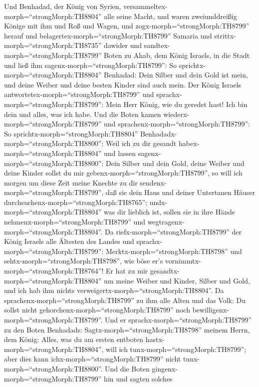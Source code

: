  Und Benhadad, der König von Syrien,
versammeltex-morph=``strongMorph:TH8804'' alle seine Macht, und waren
zweiunddreißig Könige mit ihm und Roß und Wagen, und
zogx-morph=``strongMorph:TH8799'' herauf und
belagertex-morph=``strongMorph:TH8799'' Samaria und
strittx-morph=``strongMorph:TH8735'' dawider  und
sandtex-morph=``strongMorph:TH8799'' Boten zu Ahab, dem König Israels,
in die Stadt  und ließ ihm
sagenx-morph=``strongMorph:TH8799'': So
sprichtx-morph=``strongMorph:TH8804'' Benhadad: Dein Silber und dein
Gold ist mein, und deine Weiber und deine besten Kinder sind auch mein.
 Der König Israels antwortetex-morph=``strongMorph:TH8799''
und sprachx-morph=``strongMorph:TH8799'': Mein Herr König, wie du
geredet hast! Ich bin dein und alles, was ich habe.  Und die
Boten kamen wiederx-morph=``strongMorph:TH8799'' und
sprachenx-morph=``strongMorph:TH8799'': So
sprichtx-morph=``strongMorph:TH8804''
Benhadadx-morph=``strongMorph:TH8800'': Weil ich zu dir gesandt
habex-morph=``strongMorph:TH8804'' und lassen
sagenx-morph=``strongMorph:TH8800'': Dein Silber und dein Gold, deine
Weiber und deine Kinder sollst du mir
gebenx-morph=``strongMorph:TH8799'',  so will ich morgen um
diese Zeit meine Knechte zu dir sendenx-morph=``strongMorph:TH8799'',
daß sie dein Haus und deiner Untertanen Häuser
durchsuchenx-morph=``strongMorph:TH8765'';
undx-morph=``strongMorph:TH8804'' was dir lieblich ist, sollen sie in
ihre Hände nehmenx-morph=``strongMorph:TH8799'' und
wegtragenx-morph=``strongMorph:TH8804''.  Da
riefx-morph=``strongMorph:TH8799'' der König Israels alle Ältesten des
Landes und sprachx-morph=``strongMorph:TH8799'':
Merktx-morph=``strongMorph:TH8798'' und
sehtx-morph=``strongMorph:TH8798'', wie böse er's
vornimmtx-morph=``strongMorph:TH8764''! Er hat zu mir
gesandtx-morph=``strongMorph:TH8804'' um meine Weiber und Kinder, Silber
und Gold, und ich hab ihm nichts
verweigertx-morph=``strongMorph:TH8804''.  Da
sprachenx-morph=``strongMorph:TH8799'' zu ihm alle Alten und das Volk:
Du sollst nicht gehorchenx-morph=``strongMorph:TH8799'' noch
bewilligenx-morph=``strongMorph:TH8799''.  Und er
sprachx-morph=``strongMorph:TH8799'' zu den Boten Benhadads:
Sagtx-morph=``strongMorph:TH8798'' meinem Herrn, dem König: Alles, was
du am ersten entboten hastx-morph=``strongMorph:TH8804'', will ich
tunx-morph=``strongMorph:TH8799''; aber dies kann
ichx-morph=``strongMorph:TH8799'' nicht
tunx-morph=``strongMorph:TH8800''. Und die Boten
gingenx-morph=``strongMorph:TH8799'' hin und sagten solches
